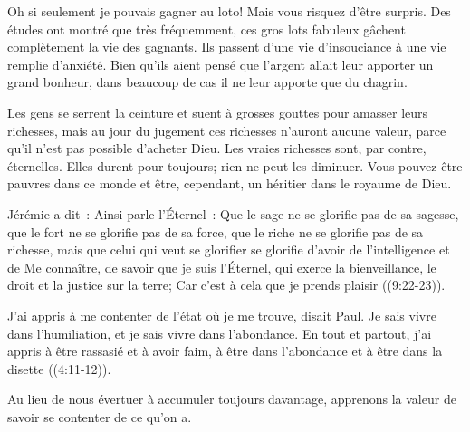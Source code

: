  
 \og Oh si seulement je pouvais gagner au loto! \fg{}
 Mais vous risquez d'être surpris. Des études ont montré
 que très fréquemment, ces gros lots fabuleux gâchent complètement
 la vie des gagnants. Ils passent d'une vie d'insouciance
 à une vie remplie d'anxiété. Bien qu'ils aient pensé
 que l'argent allait leur apporter un grand bonheur,
 dans beaucoup de cas il ne leur apporte que du chagrin.

Les gens se serrent la ceinture et suent à grosses gouttes
 pour amasser leurs richesses, mais au jour du jugement
 ces richesses n'auront aucune valeur, parce qu'il n'est pas possible
 d'acheter Dieu. Les vraies richesses sont, par contre, éternelles.
 Elles durent pour toujours; rien ne peut les diminuer.
 Vous pouvez être pauvres dans ce monde et être, cependant,
 un héritier dans le royaume de Dieu.


Jérémie a dit~: 
 \og Ainsi parle l'Éternel~: Que le sage ne se glorifie pas de sa sagesse,
 que le fort ne se glorifie pas de sa force, que le riche ne se glorifie pas
 de sa richesse, mais que celui qui veut se glorifier se glorifie d'avoir
 de l'intelligence et de Me connaître, de savoir que je suis l'Éternel,
 qui exerce la bienveillance, le droit et la justice sur la terre;
 Car c'est à cela que je prends plaisir \fg{} 
 ((9:22-23)).

\og J'ai appris à me contenter de l'état où je me trouve, disait Paul.
 Je sais vivre dans l'humiliation, et je sais vivre dans l'abondance.
 En tout et partout, j'ai appris à être rassasié et à avoir faim,
 à être dans l'abondance et à être dans la disette \fg{} 
 ((4:11-12)).

Au lieu de nous évertuer à accumuler toujours davantage, apprenons la valeur
 de savoir se contenter de ce qu'on a. 

\dvrule






